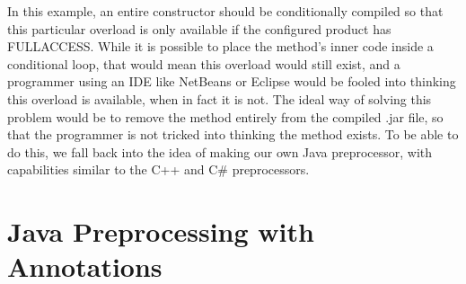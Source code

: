 In this example, an entire constructor should be conditionally compiled so that this particular overload is only available if the configured product has FULLACCESS. While it is possible to place the method's inner code inside a conditional loop, that would mean this overload would still exist, and a programmer using an IDE like NetBeans or Eclipse would be fooled into thinking this overload is available, when in fact it is not. The ideal way of solving this problem would be to remove the method entirely from the compiled .jar file, so that the programmer is not tricked into thinking the method exists. To be able to do this, we fall back into the idea of making our own Java preprocessor, with capabilities similar to the C++ and C\# preprocessors.


\section{Java Preprocessing with Annotations}
